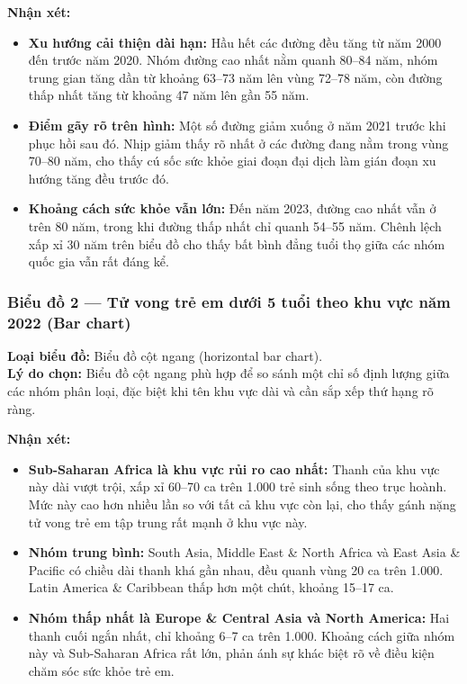 \textbf{Nhận xét:}
\begin{itemize}
    \item \textbf{Xu hướng cải thiện dài hạn:} Hầu hết các đường đều tăng từ năm 2000 đến trước năm 2020. Nhóm đường cao nhất nằm quanh 80--84 năm, nhóm trung gian tăng dần từ khoảng 63--73 năm lên vùng 72--78 năm, còn đường thấp nhất tăng từ khoảng 47 năm lên gần 55 năm.
    \item \textbf{Điểm gãy rõ trên hình:} Một số đường giảm xuống ở năm 2021 trước khi phục hồi sau đó. Nhịp giảm thấy rõ nhất ở các đường đang nằm trong vùng 70--80 năm, cho thấy cú sốc sức khỏe giai đoạn đại dịch làm gián đoạn xu hướng tăng đều trước đó.
    \item \textbf{Khoảng cách sức khỏe vẫn lớn:} Đến năm 2023, đường cao nhất vẫn ở trên 80 năm, trong khi đường thấp nhất chỉ quanh 54--55 năm. Chênh lệch xấp xỉ 30 năm trên biểu đồ cho thấy bất bình đẳng tuổi thọ giữa các nhóm quốc gia vẫn rất đáng kể.
\end{itemize}

\subsubsection{Biểu đồ 2 --- Tử vong trẻ em dưới 5 tuổi theo khu vực năm 2022 (Bar chart)}

\textbf{Loại biểu đồ:} Biểu đồ cột ngang (horizontal bar chart).\\
\textbf{Lý do chọn:} Biểu đồ cột ngang phù hợp để so sánh một chỉ số định lượng giữa các nhóm phân loại, đặc biệt khi tên khu vực dài và cần sắp xếp thứ hạng rõ ràng.


\textbf{Nhận xét:}
\begin{itemize}
    \item \textbf{Sub-Saharan Africa là khu vực rủi ro cao nhất:} Thanh của khu vực này dài vượt trội, xấp xỉ 60--70 ca trên 1.000 trẻ sinh sống theo trục hoành. Mức này cao hơn nhiều lần so với tất cả khu vực còn lại, cho thấy gánh nặng tử vong trẻ em tập trung rất mạnh ở khu vực này.
    \item \textbf{Nhóm trung bình:} South Asia, Middle East \& North Africa và East Asia \& Pacific có chiều dài thanh khá gần nhau, đều quanh vùng 20 ca trên 1.000. Latin America \& Caribbean thấp hơn một chút, khoảng 15--17 ca.
    \item \textbf{Nhóm thấp nhất là Europe \& Central Asia và North America:} Hai thanh cuối ngắn nhất, chỉ khoảng 6--7 ca trên 1.000. Khoảng cách giữa nhóm này và Sub-Saharan Africa rất lớn, phản ánh sự khác biệt rõ về điều kiện chăm sóc sức khỏe trẻ em.
\end{itemize}

